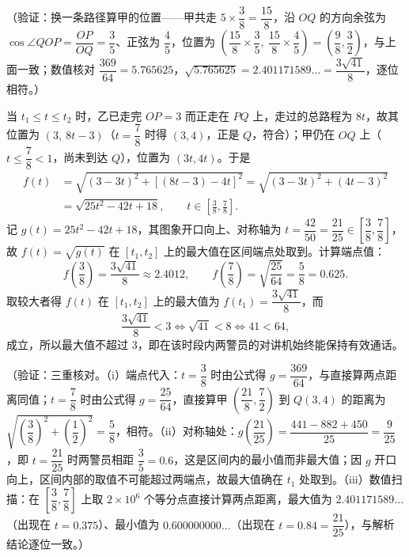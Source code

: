\begin{answer}
（验证：换一条路径算甲的位置——甲共走 \(5\times\dfrac{3}{8}=\dfrac{15}{8}\)，沿 \(OQ\) 的方向余弦为 \(\cos\angle QOP=\dfrac{OP}{OQ}=\dfrac{3}{5}\)、正弦为 \(\dfrac{4}{5}\)，位置为 \(\left(\dfrac{15}{8}\times\dfrac{3}{5},\ \dfrac{15}{8}\times\dfrac{4}{5}\right)=\left(\dfrac{9}{8},\dfrac{3}{2}\right)\)，与上面一致；数值核对 \(\dfrac{369}{64}=5.765625\)，\(\sqrt{5.765625}=2.401171589\ldots=\dfrac{3\sqrt{41}}{8}\)，逐位相符。）


当 \(t_{1}\leqslant t\leqslant t_{2}\) 时，乙已走完 \(OP=3\) 而正走在 \(PQ\) 上，走过的总路程为 \(8t\)，故其位置为 \((3,\ 8t-3)\)（\(t=\dfrac{7}{8}\) 时得 \((3,4)\)，正是 \(Q\)，符合）；甲仍在 \(OQ\) 上（\(t\leqslant\dfrac{7}{8}<1\)，尚未到达 \(Q\)），位置为 \((3t,4t)\)。于是
\nopagebreak[4]
\[
\begin{aligned}
f(t)&=\sqrt{(3-3t)^{2}+\left[(8t-3)-4t\right]^{2}}=\sqrt{(3-3t)^{2}+(4t-3)^{2}}\\
&=\sqrt{25t^{2}-42t+18},\qquad t\in\left[\frac{3}{8},\frac{7}{8}\right].
\end{aligned}
\]
记 \(g(t)=25t^{2}-42t+18\)，其图象开口向上、对称轴为 \(t=\dfrac{42}{50}=\dfrac{21}{25}\in\left[\dfrac{3}{8},\dfrac{7}{8}\right]\)，故 \(f(t)=\sqrt{g(t)}\) 在 \([t_{1},t_{2}]\) 上的最大值在区间端点处取到。计算端点值：
\nopagebreak[4]
\[
f\!\left(\frac{3}{8}\right)=\frac{3\sqrt{41}}{8}\approx2.4012,\qquad f\!\left(\frac{7}{8}\right)=\sqrt{\frac{25}{64}}=\frac{5}{8}=0.625.
\]
取较大者得 \(f(t)\) 在 \([t_{1},t_{2}]\) 上的最大值为 \(f(t_{1})=\dfrac{3\sqrt{41}}{8}\)，而
\nopagebreak[4]
\[
\frac{3\sqrt{41}}{8}<3\iff\sqrt{41}<8\iff41<64,
\]
成立，所以最大值不超过 \(3\)，即在该时段内两警员的对讲机始终能保持有效通话。

（验证：三重核对。（i）端点代入：\(t=\dfrac{3}{8}\) 时由公式得 \(g=\dfrac{369}{64}\)，与直接算两点距离同值；\(t=\dfrac{7}{8}\) 时由公式得 \(g=\dfrac{25}{64}\)，直接算甲 \(\left(\dfrac{21}{8},\dfrac{7}{2}\right)\) 到 \(Q(3,4)\) 的距离为 \(\sqrt{\left(\dfrac{3}{8}\right)^{2}+\left(\dfrac{1}{2}\right)^{2}}=\dfrac{5}{8}\)，相符。（ii）对称轴处：\(g\!\left(\dfrac{21}{25}\right)=\dfrac{441-882+450}{25}=\dfrac{9}{25}\)，即 \(t=\dfrac{21}{25}\) 时两警员相距 \(\dfrac{3}{5}=0.6\)，这是区间内的最小值而非最大值；因 \(g\) 开口向上，区间内部的取值不可能超过两端点，故最大值确在 \(t_{1}\) 处取到。（iii）数值扫描：在 \(\left[\dfrac{3}{8},\dfrac{7}{8}\right]\) 上取 \(2\times10^{6}\) 个等分点直接计算两点距离，最大值为 \(2.401171589\ldots\)（出现在 \(t=0.375\)）、最小值为 \(0.600000000\ldots\)（出现在 \(t=0.84=\dfrac{21}{25}\)），与解析结论逐位一致。）



\end{answer}
